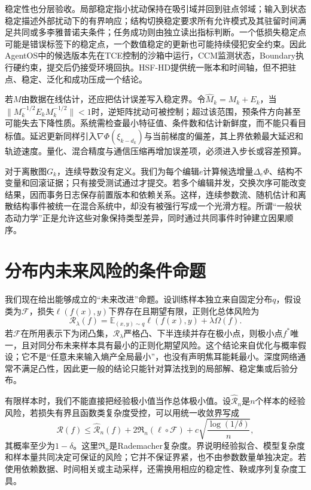 稳定性也分层验收。局部稳定指小扰动保持在吸引域并回到驻点邻域；输入到状态稳定描述外部扰动下的有界响应；结构切换稳定要求所有允许模式及其驻留时间满足共同或多李雅普诺夫条件；任务成功则由独立读出指标判断。一个低损失稳定点可能是错误标签下的稳定点，一个数值稳定的更新也可能持续侵犯安全约束。因此AgentOS中的候选版本先在TCE控制的沙箱中运行，CCM监测状态，Boundary执行硬约束，提交后仍接受环境回执。HSF-HD提供统一账本和时间轴，但不把驻点、稳定、泛化和成功压成一个结论。

若$M$由数据在线估计，还应把估计误差写入稳定界。令$\widehat M_k=M_k+E_k$，当$\|M_k^{-1/2}E_kM_k^{-1/2}\|<1$时，逆矩阵扰动可被控制；超过该范围，预条件方向甚至可能失去下降性质。系统需检查最小特征值、条件数和估计新鲜度，而不能只看目标值。延迟更新同样引入$\nabla\Phi(\xi_{k-d_k})$与当前梯度的偏差，其上界依赖最大延迟和轨迹速度。量化、混合精度与通信压缩再增加误差项，必须进入步长或容差预算。

对于离散图$G_k$，连续导数没有定义。我们为每个编辑$e$计算候选增量$\Delta_e\Phi$、结构不变量和回滚证据；只有接受测试通过才提交。若多个编辑并发，交换次序可能改变结果，因而事务日志保存前置版本和依赖关系。这样，连续参数流、随机估计和离散结构事件被统一在混合系统中，却没有被强行写成一个光滑方程。所谓“一般状态动力学”正是允许这些对象保持类型差异，同时通过共同事件时钟建立因果顺序。

\section{分布内未来风险的条件命题}
\label{sec:proof_of_minimum_future_entropy}

我们现在给出能够成立的“未来改进”命题。设训练样本独立来自固定分布$q$，假设类为$\mathcal F$，损失$\ell(f(x),y)$下界存在且期望有限，正则化总体风险为
\begin{equation}
\mathcal R_\lambda(f)=\mathbb E_{(x,y)\sim q}\ell(f(x),y)+\lambda\Omega(f).
\end{equation}
若$\mathcal F$在所用表示下为闭凸集，$\mathcal R_\lambda$严格凸、下半连续并存在极小点，则极小点$f^*$唯一，且对同分布未来样本具有最小的正则化期望风险。这个结论来自优化与概率假设；它不是“任意未来输入熵产全局最小”，也没有声明焦耳能耗最小。深度网络通常不满足凸性，因此更一般的结论只能针对算法找到的局部解、稳定集或后验分布。

有限样本时，我们不能直接把经验极小值当作总体极小值。设$\widehat{\mathcal R}_n$是$n$个样本的经验风险，若损失有界且函数类复杂度受控，可以用统一收敛界写成
\begin{equation}
\mathcal R(f)\leq\widehat{\mathcal R}_n(f)
+2\mathfrak R_n(\ell\circ\mathcal F)
+c\sqrt{\frac{\log(1/\delta)}{n}},
\end{equation}
其概率至少为$1-\delta$。这里$\mathfrak R_n$是Rademacher复杂度。界说明经验拟合、模型复杂度和样本量共同决定可保证的风险；它并不保证界紧，也不由参数数量单独决定。若使用依赖数据、时间相关或主动采样，还需换用相应的稳定性、鞅或序列复杂度工具。

